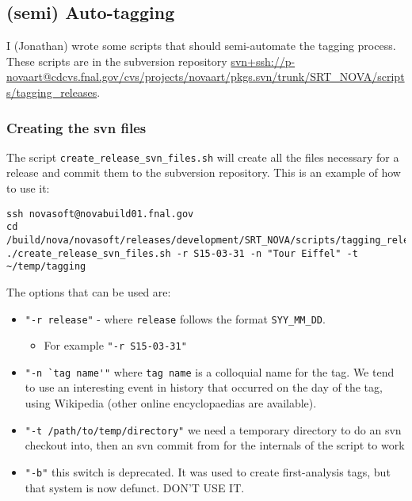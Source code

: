 \documentclass[letterpaper,10pt]{article}
\begin{document}
\subsection{(semi) Auto-tagging}

I (Jonathan) wrote some scripts that should semi-automate the tagging process. These scripts are in the subversion repository \url{svn+ssh://p-novaart@cdcvs.fnal.gov/cvs/projects/novaart/pkgs.svn/trunk/SRT_NOVA/scripts/tagging_releases}.

\subsubsection{Creating the svn files}

The script \verb|create_release_svn_files.sh| will create all the files necessary for a release and commit them to the subversion repository. This is an example of how to use it:

\begin{verbatim}
ssh novasoft@novabuild01.fnal.gov
cd /build/nova/novasoft/releases/development/SRT_NOVA/scripts/tagging_releases/
./create_release_svn_files.sh -r S15-03-31 -n "Tour Eiffel" -t ~/temp/tagging
\end{verbatim}

\noindent
The options that can be used are:
\begin{itemize}
\item \verb|"-r release"| - where \verb|release| follows the format \verb|SYY_MM_DD|. 
\begin{itemize}
  \item For example \verb|"-r S15-03-31"|
  \end{itemize}
  
\item \verb|"-n `tag name'"| where \verb|tag name| is a colloquial name for the tag. We tend to use an interesting event in history that occurred on the day of the tag, using Wikipedia (other online encyclopaedias are available).

\item \verb|"-t /path/to/temp/directory"| we need a temporary directory to do an svn checkout into, then an svn commit from for the internals of the script to work

\item \verb|"-b"| this switch is deprecated. It was used to create first-analysis tags, but that system is now defunct. DON'T USE IT.

\end{itemize}
 
\end{document}
